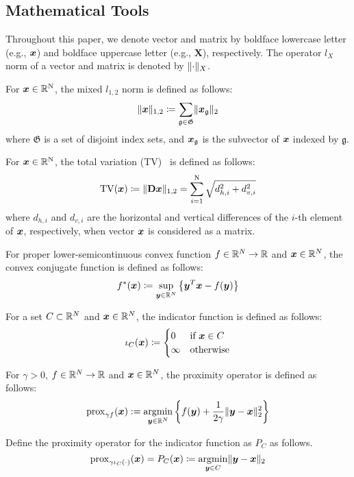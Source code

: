 \subsection{Mathematical Tools}\label{subsec:mathematical-tools}

Throughout this paper, we denote vector and matrix by boldface lowercase letter (e.g., $\vecx$) and boldface uppercase letter (e.g., $\bm{X}$), respectively.
The operator $l_{X}$ norm of a vector and matrix is denoted by $\Norm{\cdot}__{X}$.

For $\vecx \in \realNumber^{\intN}$, the mixed $l_{1,2}$ norm is defined as follows:
\begin{equation} \label{eq:L12NormDefinitionEq} \LOneTwoNormDefinition \end{equation}
where $\mathfrak{G}$ is a set of disjoint index sets, and $\vecx_{\mathfrak{g}}$ is the subvector of $\vecx$ indexed by $\mathfrak{g}$.

For $\vecx \in \realNumber^{\intN}$, the total variation (TV)~\cite{TV} is defined as follows:
\begin{equation} \label{eq:TVDefinitionEq} \TotalVariationDefinition \end{equation}
where $d_{h,i}$ and $d_{v,i}$ are the horizontal and vertical differences of the $i$-th element of $\vecx$, respectively, when vector $\vecx$ is considered as a matrix.

For proper lower-semicontinuous convex function $f \in \realNumber^N \to \realNumber$ and $\vecx \in \realNumber^N$, the convex conjugate function is defined as follows:
\begin{equation} \label{eq:ConjugateFunctionDefinitionEq} \conjugateFunctionDefinition \end{equation}

For a set $C \subset \realNumber^N$ and $\vecx \in \realNumber^N$, the indicator function is defined as follows:
\begin{equation} \label{eq:IndicatorFunctionDefinitionEq} \indicatorFunctionDefinition \end{equation}

For $\gamma > 0$, $f \in \realNumber^N \to \realNumber$ and $\vecx \in \realNumber^N$, the proximity operator is defined as follows:
\begin{equation} \label{eq:ProximityOperatorDefinitionEq} \proximityOperatorDefinition \end{equation}

Define the proximity operator for the indicator function as $P_C$ as follows.
\begin{equation} \label{eq:ProximityOperatorDefinitionWithIndicatorFunctionEq}
\proximityOperator{ \gamma \indicatorFunction{C}{\cdot} }{\vecx} = P_C(\vecx) \coloneq \argmin{\vecy \in C} \LTwoNorm{\vecy - \vecx}
\end{equation}

